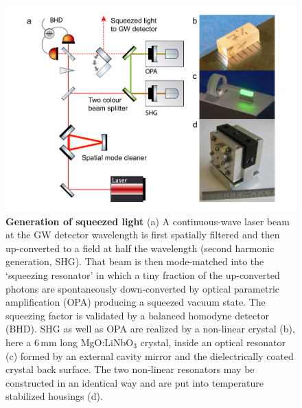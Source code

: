 \begin{figure}[ht]
  \centering
  \includegraphics[scale = 1]{./Sec_Optics/SqzGen.pdf}
  \vspace{-1mm}
\caption{{\textbf{Generation of squeezed light} (a) A continuous-wave laser beam at the GW detector wavelength is first spatially filtered and then up-converted to a field at half the wavelength (second harmonic generation, SHG). That beam is then mode-matched into the `squeezing resonator' in which a tiny fraction of the up-converted photons are spontaneously down-converted by optical parametric amplification (OPA) producing a squeezed vacuum state. The squeezing factor is validated by a balanced homodyne detector (BHD). SHG as well as OPA are realized by a non-linear crystal (b), here a 6\,mm long MgO:LiNbO$_3$ crystal, inside an optical resonator (c) formed by an external cavity mirror and the dielectrically coated crystal back surface. The two non-linear resonators may be constructed in an identical way and are put into temperature stabilized housings (d).}
}
\label{fig:SqzGen}
\end{figure}

